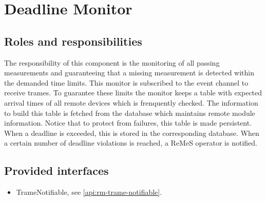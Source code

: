 \section{Deadline Monitor}
\label{element:rm-deadline-monitor}

\subsection{Roles and responsibilities}

\npar The responsibility of this component is the monitoring of all passing
measurements and guaranteeing that a missing measurement is detected within the
demanded time limits. This monitor is subscribed to the event channel to receive
trames. To guarantee these limits the monitor keeps a table with expected
arrival times of all remote devices which is frenquently checked. The
information to build this table is fetched from the database which maintains
remote module information. Notice that to protect from failures, this table is
made persistent. When a deadline is exceeded, this is stored in the
corresponding database. When a certain number of deadline violations is reached,
a ReMeS operator is notified.

\subsection{Provided interfaces}

\begin{itemize}
  \item TrameNotifiable, see \ref{api:rm-trame-notifiable}.
\end{itemize}